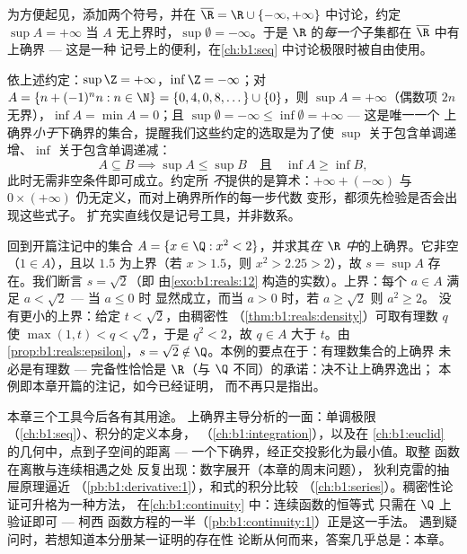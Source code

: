 \begin{remark}[扩充实直线]
为方便起见，添加两个符号，并在 $\overline\R = \R
\cup \{-\infty, +\infty\}$ 中讨论，约定 $\sup A = +\infty$
当 $A$ 无上界时，$\sup \emptyset = -\infty$。于是
$\R$ 的\emph{每一个}子集都在 $\overline\R$ 中有上确界 --- 这是一种
记号上的便利，在\cref{ch:b1:seq} 中讨论极限时被自由使用。
\end{remark}

\begin{example}\label{ex:b1:reals:extendedcompute}
依上述约定：$\sup \Z = +\infty$，$\inf \Z =
-\infty$；对 $A = \{n + (-1)^n n : n \in \N\} = \{0, 4, 0, 8,
\dots\} \cup \{0\}$，则 $\sup A = +\infty$（偶数项 $2n$
无界），$\inf A = \min A = 0$；且 $\sup\emptyset =
-\infty \leq \inf\emptyset = +\infty$ --- 这是唯一一个
上确界\emph{小于}下确界的集合，提醒我们这些约定的选取是为了使
$\sup$ 关于包含单调递增、$\inf$
关于包含单调递减：
\[
A \subseteq B \implies \sup A \leq \sup B
\quad\text{且}\quad \inf A \geq \inf B ,
\]
此时无需非空条件即可成立。约定所
\emph{不}提供的是算术：$+\infty + (-\infty)$ 与 $0
\times (+\infty)$ 仍无定义，而对上确界所作的每一步代数
变形，都须先检验是否会出现这些式子。
扩充实直线仅是记号工具，并非数系。
\end{example}

\begin{example}[逸出 $\Q$ 的上确界]\label{ex:b1:reals:supescape}
回到开篇注记中的集合 $A = \{x \in \Q : x^2 <
2\}$，并求其\emph{在 $\R$ 中}的上确界。它非空
（$1 \in A$），且以 $1.5$ 为上界（若 $x > 1.5$，则 $x^2 >
2.25 > 2$），故 $s = \sup A$ 存在。我们断言 $s = \sqrt 2$（即
由\cref{exo:b1:reals:12} 构造的实数）。上界：每个
$a \in A$ 满足 $a < \sqrt2$ --- 当 $a \leq 0$ 时
显然成立，而当 $a > 0$ 时，若 $a \geq \sqrt2$ 则 $a^2 \geq 2$。
没有更小的上界：给定 $t < \sqrt2$，由稠密性
（\cref{thm:b1:reals:density}）可取有理数 $q$ 使
$\max(1, t) < q < \sqrt 2$，于是 $q^2 < 2$，故 $q \in A$
大于 $t$。由\cref{prop:b1:reals:epsilon}，$s = \sqrt2
\notin \Q$。本例的要点在于：有理数集合的上确界
未必是有理数 --- 完备性恰恰是
$\R$（与 $\Q$ 不同）的承诺：决不让上确界逸出；
本例即本章开篇的注记，如今已经证明，
而不再只是指出。
\end{example}

\begin{remark}[本分册内的展望]
本章三个工具今后各有其用途。
上确界主导分析的一面：单调极限
（\cref{ch:b1:seq}）、积分的定义本身，
（\cref{ch:b1:integration}），以及在
\cref{ch:b1:euclid} 的几何中，点到子空间的距离 ---
一个下确界，经正交投影化为最小值。取整
函数在离散与连续相遇之处
反复出现：数字展开（本章的周末问题），
狄利克雷的抽屉原理逼近
（\cref{pb:b1:derivative:1}），和式的积分比较
（\cref{ch:b1:series}）。稠密性论证可升格为一种方法，
在\cref{ch:b1:continuity} 中：连续函数的恒等式
只需在 $\Q$ 上验证即可 --- 柯西
函数方程的一半（\cref{pb:b1:continuity:1}）正是这一手法。
遇到疑问时，若想知道本分册某一证明的存在性
论断从何而来，答案几乎总是：本章。
\end{remark}

